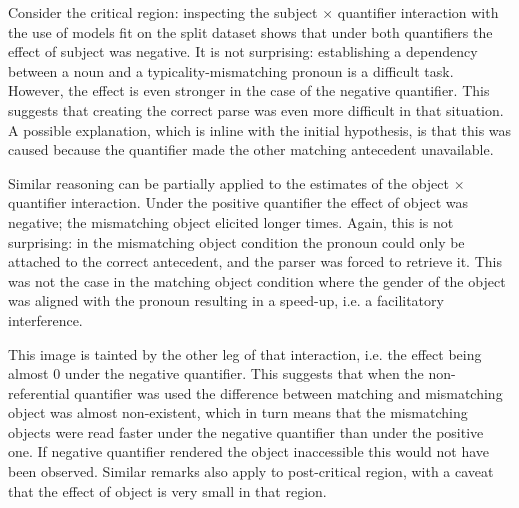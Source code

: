 Consider the critical region: inspecting the subject $\times$ quantifier interaction with the use of models fit on the split dataset shows that under both quantifiers the effect of subject was negative. It is not surprising: establishing a dependency between a noun and a typicality-mismatching pronoun is a difficult task. However, the effect is even stronger in the case of the negative quantifier. This suggests that creating the correct parse was even more difficult in that situation. A possible explanation, which is inline with the initial hypothesis, is that this was caused because the quantifier made the other matching antecedent unavailable.

Similar reasoning can be partially applied to the estimates of the object $\times$ quantifier interaction.
Under the positive quantifier the effect of object was negative; the mismatching object elicited longer times. Again, this is not surprising: in the mismatching object condition the pronoun could only be attached to the correct antecedent, and the parser was forced to retrieve it. This was not the case in the matching object condition where the gender of the object was aligned with the pronoun resulting in a speed-up, i.e. a facilitatory interference.

This image is tainted by the other leg of that interaction, i.e. the effect being almost 0 under the negative quantifier. This suggests that when the non-referential quantifier was used the difference between matching and mismatching object was almost non-existent, which in turn means that the mismatching objects were read faster under the negative quantifier than under the positive one. If negative quantifier rendered the object inaccessible this would not have been observed.
Similar remarks also apply to post-critical region, with a caveat that the effect of object is very small in that region.


